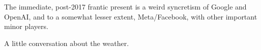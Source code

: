 \documentclass{beamer}
\begin{document}

\begin{frame}
	The immediate, post-2017 frantic present is a weird syncretism of Google and OpenAI, and to a somewhat lesser extent, Meta/Facebook, with other important minor players.
\end{frame} 


\begin{frame}
	A little conversation about the weather.
\end{frame}

\begin{frame}[plain]
\end{frame}
\end{document}
